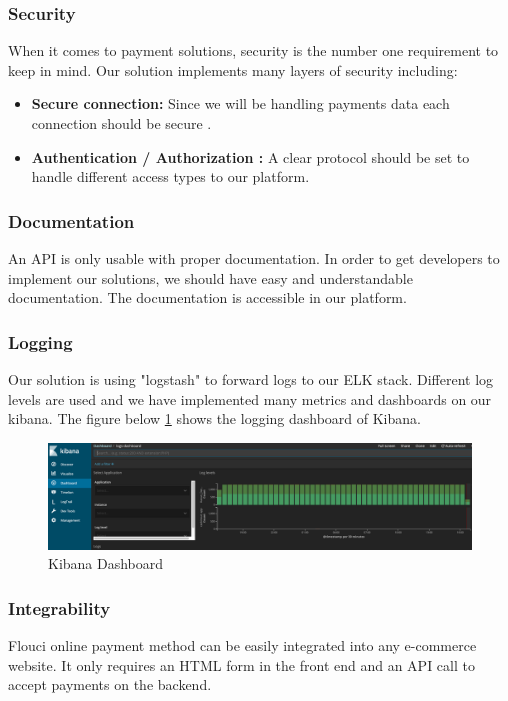 \begin{spacing}{1.2}
\subsubsection{Security}
When it comes to payment solutions, security is the number one requirement to keep in mind.
Our solution implements many layers of security including:
\begin{itemize}
	\item \textbf{Secure connection:} Since we will be handling payments data each connection should be secure .
	\item \textbf{Authentication / Authorization :}  A clear protocol should be set to handle different access types to our platform.
    \end{itemize}
\subsubsection{Documentation}
An API is only usable with proper documentation. In order to get developers to implement our solutions, we should have easy and understandable documentation. The documentation is accessible in our platform.\subsubsection{Logging}
Our solution is using "logstash" to forward logs to our ELK \cite{ELK} stack. Different log levels are used and we have implemented many metrics and dashboards on our kibana.
The figure below \ref{fig:kibana} shows the logging dashboard of Kibana.
\begin{figure}[H]\centering
\includegraphics[scale=0.3]{ELK.png}
\caption{Kibana Dashboard}
\label{fig:kibana}
\end{figure}

\subsubsection{Integrability}
Flouci online payment method can be easily integrated into any e-commerce website. It only requires an HTML form in the front end and an API call to accept payments on the backend.


\end{spacing}
